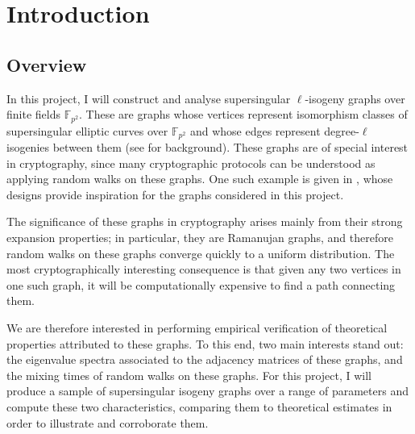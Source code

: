 \chapter{Introduction}\label{ch:introduction}
      \section{Overview}
        In this project, I will construct and analyse supersingular $\ell$-isogeny graphs over finite fields $\mathbb{F}_{p^2}$. These are graphs whose vertices represent isomorphism classes of supersingular elliptic curves over $\mathbb{F}_{p^2}$ and whose edges represent degree-$\ell$ isogenies between them (see \cite{isogeny_school1} for background). These graphs are of special interest in cryptography, since many cryptographic protocols can be understood as applying random walks on these graphs. One such example is given in \cite{CSIDH}, whose designs provide inspiration for the graphs considered in this project.

        The significance of these graphs in cryptography arises mainly from their strong expansion properties; in particular, they are Ramanujan graphs, and therefore random walks on these graphs converge quickly to a uniform distribution. The most cryptographically interesting consequence is that given any two vertices in one such graph, it will be computationally expensive to find a path connecting them.

        We are therefore interested in performing empirical verification of theoretical properties attributed to these graphs. To this end, two main interests stand out: the eigenvalue spectra associated to the adjacency matrices of these graphs, and the mixing times of random walks on these graphs. For this project, I will produce a sample of supersingular isogeny graphs over a range of parameters and compute these two characteristics, comparing them to theoretical estimates in order to illustrate and corroborate them.

